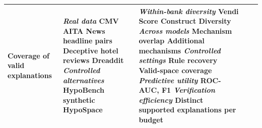 \begin{table}[H]
{\begin{tabular}{@{}p{}p{}p{}p{}p{}@{}}
Coverage of valid explanations
&
\raggedright
\textit{Real data}\newline
CMV\newline
AITA\newline
News headline pairs\newline
Deceptive hotel reviews\newline
Dreaddit\newline
\newline
\textit{Controlled alternatives}\newline
HypoBench synthetic\newline
HypoSpace
&
\raggedright
\textit{Within-bank diversity}\newline
Vendi Score\newline
Construct Diversity\newline
\newline
\textit{Across models}\newline
Mechanism overlap\newline
Additional mechanisms\newline
\newline
\textit{Controlled settings}\newline
Rule recovery\newline
Valid-space coverage\newline
\newline
\textit{Predictive utility}\newline
ROC-AUC, F1\newline
\newline
\textit{Verification efficiency}\newline
Distinct supported explanations per budget
\tabularnewline
\bottomrule
\end{tabular}%
}
\endgroup
\end{table}

